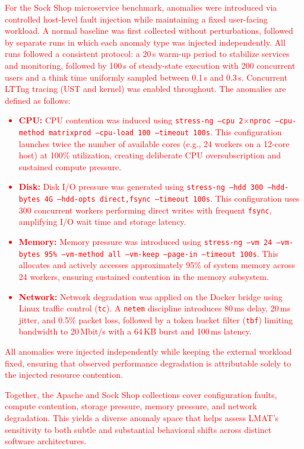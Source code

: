 \documentclass[preprint,12pt]{elsarticle}
\begin{document}
\textcolor{red}{
For the Sock Shop microservice benchmark, anomalies were introduced via controlled host-level fault injection while maintaining a fixed user-facing workload. A normal baseline was first collected without perturbations, followed by separate runs in which each anomaly type was injected independently. All runs followed a consistent protocol: a 20\,s warm-up period to stabilize services and monitoring, followed by 100\,s of steady-state execution with 200 concurrent users and a think time uniformly sampled between 0.1\,s and 0.3\,s. Concurrent LTTng tracing (UST and kernel) was enabled throughout.
The anomalies are defined as follows:
\begin{itemize}
\item \textbf{CPU:} CPU contention was induced using \texttt{stress-ng --cpu 2$\times$nproc --cpu-method matrixprod --cpu-load 100 --timeout 100s}. This configuration launches twice the number of available cores (e.g., 24 workers on a 12-core host) at 100\% utilization, creating deliberate CPU oversubscription and sustained compute pressure.
\item \textbf{Disk:} Disk I/O pressure was generated using \texttt{stress-ng --hdd 300 --hdd-bytes 4G --hdd-opts direct,fsync --timeout 100s}. This configuration uses 300 concurrent workers performing direct writes with frequent \texttt{fsync}, amplifying I/O wait time and storage latency.
\item \textbf{Memory:} Memory pressure was introduced using \texttt{stress-ng --vm 24 --vm-bytes 95\% --vm-method all --vm-keep --page-in --timeout 100s}. This allocates and actively accesses approximately 95\% of system memory across 24 workers, ensuring sustained contention in the memory subsystem.
\item \textbf{Network:} Network degradation was applied on the Docker bridge using Linux traffic control (\texttt{tc}). A \texttt{netem} discipline introduces 80\,ms delay, 20\,ms jitter, and 0.5\% packet loss, followed by a token bucket filter (\texttt{tbf}) limiting bandwidth to 20\,Mbit/s with a 64\,KB burst and 100\,ms latency.
\end{itemize}
All anomalies were injected independently while keeping the external workload fixed, ensuring that observed performance degradation is attributable solely to the injected resource contention.
}

\textcolor{red}{Together, the Apache and Sock Shop collections cover configuration faults, compute contention, storage pressure, memory pressure, and network degradation. This yields a diverse anomaly space that helps assess LMAT's sensitivity to both subtle and substantial behavioral shifts across distinct software architectures.}
\end{document}
